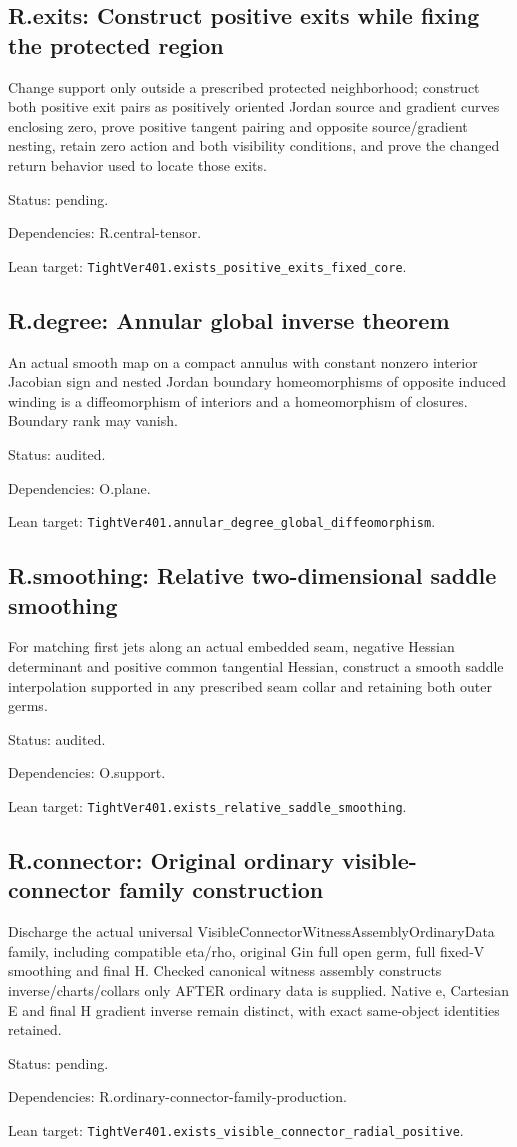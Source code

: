 \documentclass{article}
\begin{document}
\subsection*{R.exits: Construct positive exits while fixing the protected region}
Change support only outside a prescribed protected neighborhood; construct both positive exit pairs as positively oriented Jordan source and gradient curves enclosing zero, prove positive tangent pairing and opposite source/gradient nesting, retain zero action and both visibility conditions, and prove the changed return behavior used to locate those exits.
\par Status: pending.
\par Dependencies: R.central-tensor.
\par Lean target: \texttt{TightVer401.exists\_positive\_exits\_fixed\_core}.
\subsection*{R.degree: Annular global inverse theorem}
An actual smooth map on a compact annulus with constant nonzero interior Jacobian sign and nested Jordan boundary homeomorphisms of opposite induced winding is a diffeomorphism of interiors and a homeomorphism of closures. Boundary rank may vanish.
\par Status: audited.
\par Dependencies: O.plane.
\par Lean target: \texttt{TightVer401.annular\_degree\_global\_diffeomorphism}.
\subsection*{R.smoothing: Relative two-dimensional saddle smoothing}
For matching first jets along an actual embedded seam, negative Hessian determinant and positive common tangential Hessian, construct a smooth saddle interpolation supported in any prescribed seam collar and retaining both outer germs.
\par Status: audited.
\par Dependencies: O.support.
\par Lean target: \texttt{TightVer401.exists\_relative\_saddle\_smoothing}.
\subsection*{R.connector: Original ordinary visible-connector family construction}
Discharge the actual universal VisibleConnectorWitnessAssemblyOrdinaryData family, including compatible eta/rho, original Gin full open germ, full fixed-V smoothing and final H. Checked canonical witness assembly constructs inverse/charts/collars only AFTER ordinary data is supplied. Native e, Cartesian E and final H gradient inverse remain distinct, with exact same-object identities retained.
\par Status: pending.
\par Dependencies: R.ordinary-connector-family-production.
\par Lean target: \texttt{TightVer401.exists\_visible\_connector\_radial\_positive}.
\end{document}
